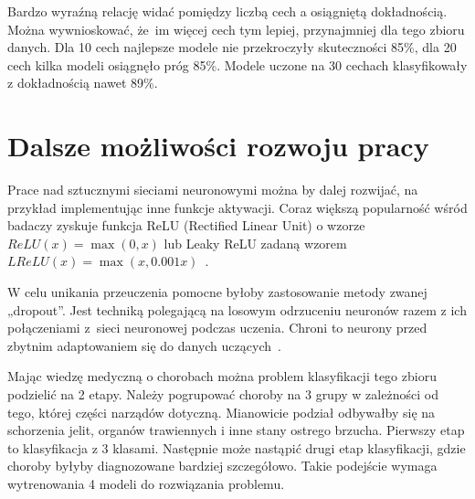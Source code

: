     Bardzo wyraźną relację widać pomiędzy liczbą cech a osiągniętą dokładnością.
    Można wywnioskować, że~im więcej cech tym lepiej, przynajmniej dla tego zbioru danych.
    Dla 10 cech najlepsze modele nie przekroczyły skuteczności 85\%, dla 20 cech kilka modeli osiągnęło próg 85\%.
    Modele uczone na 30 cechach klasyfikowały z dokładnością nawet 89\%.

    \section{Dalsze możliwości rozwoju pracy}\label{sec:dalszeMożliwościRozwojuPracy}

    Prace nad sztucznymi sieciami neuronowymi można by dalej rozwijać, na przykład implementując inne funkcje aktywacji.
    Coraz większą popularność wśród badaczy zyskuje funkcja ReLU (Rectified Linear Unit) o wzorze $ReLU(x) = \max(0, x)$ lub Leaky ReLU zadaną wzorem $LReLU(x) = \max(x, 0.001x)$~\cite{cs231_neural_2}.

    W celu unikania przeuczenia pomocne byłoby zastosowanie metody zwanej „dropout”.
    Jest techniką polegającą na losowym odrzuceniu neuronów razem z ich połączeniami z~sieci neuronowej podczas uczenia.
    Chroni to neurony przed zbytnim adaptowaniem się do danych uczących~\cite{dropout}.

    Mając wiedzę medyczną o chorobach można problem klasyfikacji tego zbioru podzielić na 2 etapy.
    Należy pogrupować choroby na 3 grupy w zależności od tego, której części narządów dotyczną.
    Mianowicie podział odbywałby się na schorzenia jelit, organów trawiennych i inne stany ostrego brzucha.
    Pierwszy etap to klasyfikacja z 3 klasami.
    Następnie może nastąpić drugi etap klasyfikacji, gdzie choroby byłyby diagnozowane bardziej szczegółowo.
    Takie podejście wymaga wytrenowania 4 modeli do rozwiązania problemu.

    \listoffigures
    \listoftables

    
    


